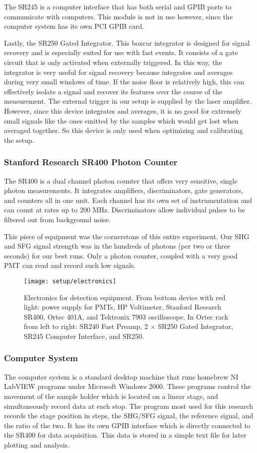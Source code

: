 The SR245 is a computer interface that has both serial and GPIB ports to communicate with computers. This module is not in use however, since the computer system has its own PCI GPIB card.

Lastly, the SR250 Gated Integrator. This boxcar integrator is designed for signal recovery and is especially suited for use with fast events. It consists of a gate circuit that is only activated when externally triggered. In this way, the integrator is very useful for signal recovery because integrates and averages during very small windows of time. If the noise floor is relatively high, this can effectively isolate a signal and recover its features over the course of the measurement. The external trigger in our setup is supplied by the laser amplifier. However, since this device integrates and averages, it is no good for extremely small signals like the ones emitted by the samples which would get lost when averaged together. So this device is only used when optimizing and calibrating the setup.

\subsubsection{Stanford Research SR400 Photon Counter}
The SR400 is a dual channel photon counter that offers very sensitive, single photon measurements. It integrates amplifiers, discriminators, gate generators, and counters all in one unit. Each channel has its own set of instrumentation and can count at rates up to 200 MHz. Discriminators allow individual pulses to be filtered out from background noise. 

This piece of equipment was the cornerstone of this entire experiment. Our SHG and SFG signal strength was in the hundreds of photons (per two or three seconds) for our best runs. Only a photon counter, coupled with a very good PMT can read and record such low signals.

\begin{figure}[h]
\centering
\texttt{[image: setup/electronics]}
\caption[Electronics for detection equipment.]{Electronics for detection equipment. From bottom device with red light: power supply for PMTs, HP Voltimeter, Stanford Research SR400, Ortec 401A, and Tektronix 7903 oscilloscope. In Ortec rack from left to right: SR240 Fast Preamp, 2 $\times$ SR250 Gated Integrator, SR245 Computer Interface, and SR250.\label{fig_electronics}}
\end{figure}

\subsubsection{Computer System}
The computer system is a standard desktop machine that runs homebrew NI LabVIEW programs under Microsoft Windows 2000. These programs control the movement of the sample holder which is located on a linear stage, and simultaneously record data at each stop. The program most used for this research records the stage position in steps, the SHG/SFG signal, the reference signal, and the ratio of the two. It has its own GPIB interface which is directly connected to the SR400 for data acquisition. This data is stored in a simple text file for later plotting and analysis.

